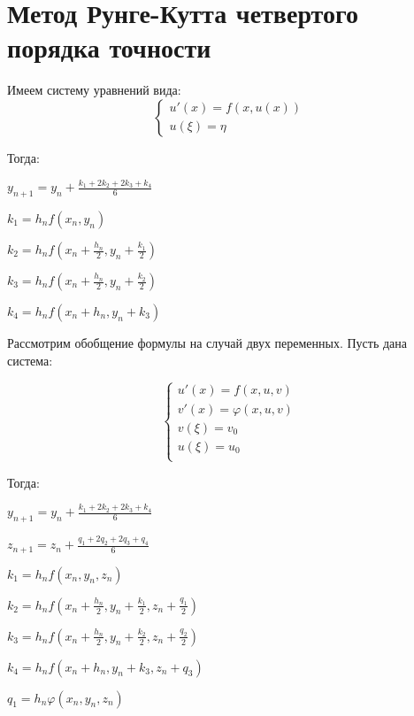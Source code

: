 \section{Метод Рунге-Кутта четвертого порядка точности}

Имеем систему уравнений вида:
\begin{equation*}
    \begin{cases}
        u'(x) = f(x, u(x)) \\
        u(\xi) = \eta
    \end{cases}
\end{equation*}

Тогда:\newline

$y_{n+1} = y_n + \frac{k_1 + 2k_2 + 2k_3 + k_4}{6}$

$k_1 = h_n f(x_n, y_n)$

$k_2 = h_n f(x_n + \frac{h_n}{2}, y_n + \frac{k_1}{2})$

$k_3 = h_n f(x_n + \frac{h_n}{2}, y_n + \frac{k_2}{2})$

$k_4 = h_n f(x_n + h_n, y_n + k_3)$\newline

Рассмотрим обобщение формулы на случай двух переменных. Пусть дана система:

\begin{equation*}
    \begin{cases}
        u'(x) = f(x, u, v) \\
        v'(x) = \varphi(x, u, v) \\
        v(\xi) = v_0 \\
        u(\xi) = u_0 \\
    \end{cases}
\end{equation*}

Тогда:\newline

$y_{n+1} = y_n + \frac{k_1 + 2k_2 + 2k_3 + k_4}{6}$

$z_{n+1} = z_n + \frac{q_1 + 2q_2 + 2q_3 + q_4}{6}$

$k_1 = h_n f(x_n, y_n, z_n)$

$k_2 = h_n f(x_n + \frac{h_n}{2}, y_n + \frac{k_1}{2}, z_n + \frac{q_1}{2})$

$k_3 = h_n f(x_n + \frac{h_n}{2}, y_n + \frac{k_2}{2}, z_n + \frac{q_2}{2})$

$k_4 = h_n f(x_n + h_n, y_n + k_3, z_n + q_3)$

$q_1 = h_n \varphi(x_n, y_n, z_n)$

